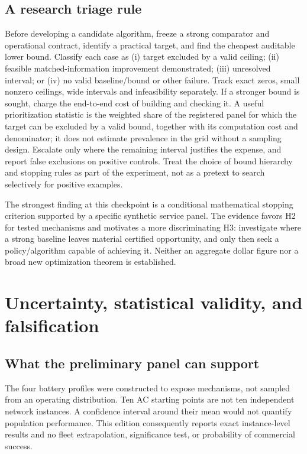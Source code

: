 \documentclass[11pt,letterpaper]{article}
\begin{document}
\subsection{A research triage rule}
Before developing a candidate algorithm, freeze a strong comparator and operational contract, identify a practical target, and find the cheapest auditable lower bound. Classify each case as (i) target excluded by a valid ceiling; (ii) feasible matched-information improvement demonstrated; (iii) unresolved interval; or (iv) no valid baseline/bound or other failure. Track exact zeros, small nonzero ceilings, wide intervals and infeasibility separately. If a stronger bound is sought, charge the end-to-end cost of building and checking it. A useful prioritization statistic is the weighted share of the registered panel for which the target can be excluded by a valid bound, together with its computation cost and denominator; it does not estimate prevalence in the grid without a sampling design. Escalate only where the remaining interval justifies the expense, and report false exclusions on positive controls. Treat the choice of bound hierarchy and stopping rules as part of the experiment, not as a pretext to search selectively for positive examples.

The strongest finding at this checkpoint is a conditional mathematical stopping criterion supported by a specific synthetic service panel. The evidence favors H2 for tested mechanisms and motivates a more discriminating H3: investigate where a strong baseline leaves material certified opportunity, and only then seek a policy/algorithm capable of achieving it. Neither an aggregate dollar figure nor a broad new optimization theorem is established.

\section{Uncertainty, statistical validity, and falsification}
\label{sec:uncertainty}
\subsection{What the preliminary panel can support}
The four battery profiles were constructed to expose mechanisms, not sampled from an operating distribution. Ten AC starting points are not ten independent network instances. A confidence interval around their mean would not quantify population performance. This edition consequently reports exact instance-level results and no fleet extrapolation, significance test, or probability of commercial success.
\end{document}
